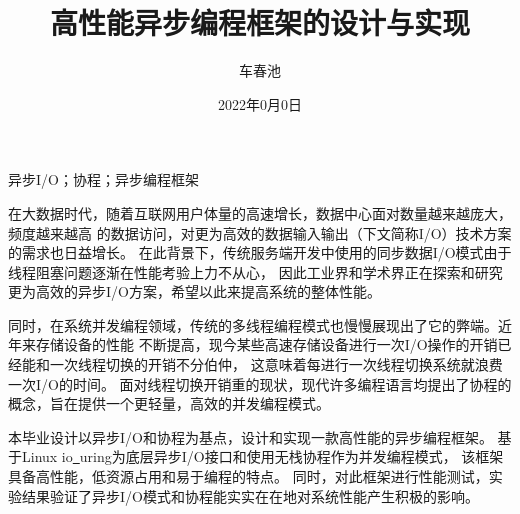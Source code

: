 \documentclass[supercite]{HustGraduPaper}
\title{高性能异步编程框架的设计与实现}
\author{车春池}
\date{2022年0月0日}
\theoremstyle{definition}
\begin{document}
\maketitle

\statement

\clearpage


\begin{cnabstract}{异步I/O；协程；异步编程框架}

在大数据时代，随着互联网用户体量的高速增长，数据中心面对数量越来越庞大，频度越来越高
的数据访问，对更为高效的数据输入输出（下文简称I/O）技术方案的需求也日益增长。
在此背景下，传统服务端开发中使用的同步数据I/O模式由于线程阻塞问题逐渐在性能考验上力不从心，
因此工业界和学术界正在探索和研究更为高效的异步I/O方案，希望以此来提高系统的整体性能。\par

同时，在系统并发编程领域，传统的多线程编程模式也慢慢展现出了它的弊端。近年来存储设备的性能
不断提高，现今某些高速存储设备进行一次I/O操作的开销已经能和一次线程切换的开销不分伯仲，
这意味着每进行一次线程切换系统就浪费一次I/O的时间。
面对线程切换开销重的现状，现代许多编程语言均提出了协程的概念，旨在提供一个更轻量，高效的并发编程模式。\par

本毕业设计以异步I/O和协程为基点，设计和实现一款高性能的异步编程框架。
基于Linux io\underline{~}uring为底层异步I/O接口和使用无栈协程作为并发编程模式，
该框架具备高性能，低资源占用和易于编程的特点。
同时，对此框架进行性能测试，实验结果验证了异步I/O模式和协程能实实在在地对系统性能产生积极的影响。

\end{cnabstract}
\end{document}
